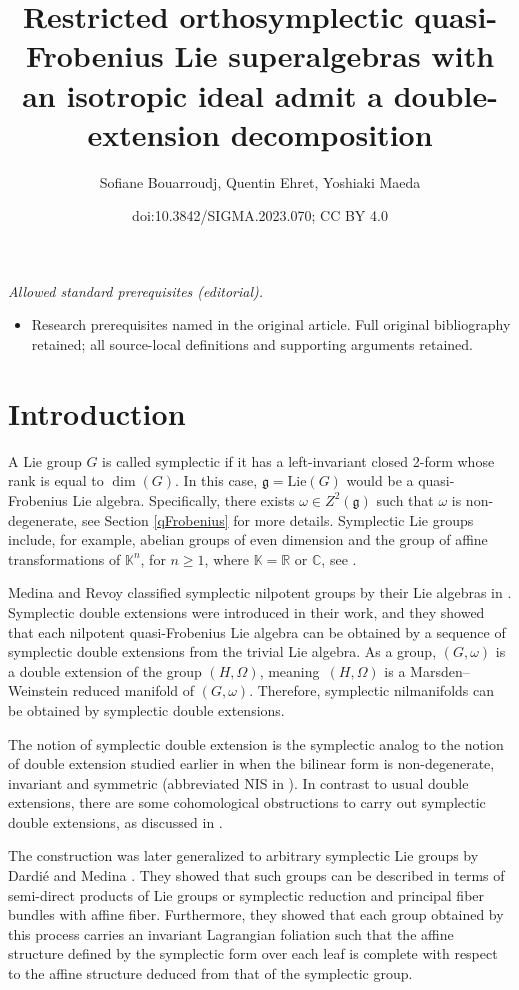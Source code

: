 \documentclass[10pt,a4paper]{amsart}
\title{Restricted orthosymplectic quasi-Frobenius Lie superalgebras with an isotropic ideal admit a double-extension decomposition}
\author{Sofiane Bouarroudj, Quentin Ehret, Yoshiaki Maeda}
\date{doi:10.3842/SIGMA.2023.070; CC BY 4.0}
\numberwithin{equation}{section}
\begin{document}
\maketitle
\noindent\textit{Allowed standard prerequisites (editorial).}\begin{itemize}
\item Research prerequisites named in the original article. Full original bibliography retained; all source-local definitions and supporting arguments retained.
\end{itemize}\medskip
\section{Introduction} %

A Lie group $G$ is called symplectic if it has a left-invariant closed 2-form whose rank is equal to $\dim(G)$. In this case, $\mathfrak{g} = \mathrm{Lie}(G)$ would be a quasi-Frobenius Lie algebra. Specifically, there exists $\omega \in Z^2(\mathfrak{g})$ such that $\omega$ is non-degenerate, see Section \ref{qFrobenius} for more details. Symplectic Lie groups include, for example, abelian groups of even dimension and the group of affine transformations of ${\mathbb K}^n$, for $n\geq 1$, where ${\mathbb K}={\mathbb R}$ or ${\mathbb C}$, see \cite{BC, MR2}.

Medina and Revoy classified symplectic nilpotent groups by their Lie algebras in \cite{MR2}. Symplectic double extensions were introduced in their work, and they showed that each nilpotent quasi-Frobenius Lie algebra can be obtained by a sequence of symplectic double extensions from the trivial Lie algebra. As a group, $(G, \omega)$ is a double extension of the group $(H, \Omega)$, meaning~$(H, \Omega)$ is a Marsden--Weinstein reduced manifold of $(G, \omega)$. Therefore, symplectic nilmanifolds can be obtained by symplectic double extensions.

The notion of symplectic double extension is the symplectic analog to the notion of double extension studied earlier in \cite{FS, MR1} when the bilinear form is non-degenerate, invariant and symmetric (abbreviated NIS in \cite{BKLS}). In contrast to usual double extensions, there are some cohomological obstructions to carry out symplectic double extensions, as discussed in \cite{MR2}.

The construction was later generalized to arbitrary symplectic Lie groups by Dardi\'e and Medina \cite{DM1}. They showed that such groups can be described in terms of semi-direct products of Lie groups or symplectic reduction and principal fiber bundles with affine fiber. Furthermore, they showed that each group obtained by this process carries an invariant Lagrangian foliation such that the affine structure defined by the symplectic form over each leaf is complete with respect to the affine structure deduced from that of the symplectic group.
\end{document}
